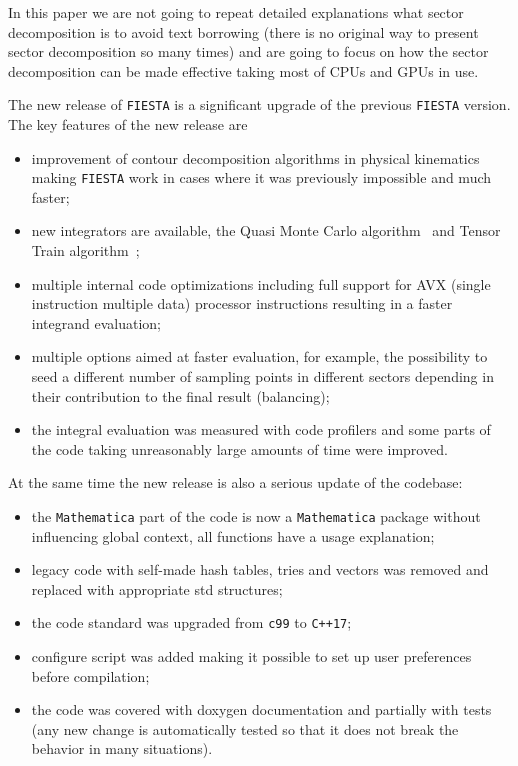 \documentclass[preprint,12pt]{elsarticle}
\begin{document}
In this paper we are not going to repeat detailed explanations what sector decomposition is to avoid 
text borrowing (there is no original way to present sector decomposition so many times)
and are going to focus on how the sector decomposition can be made effective taking most 
of CPUs and GPUs in use.

The new release of {\tt FIESTA} is a significant upgrade of the previous {\tt FIESTA} version.
The key features of the new release are
\begin{itemize}
 \item improvement of contour decomposition algorithms in physical kinematics making {\tt FIESTA} work in cases where it was previously impossible and much faster; 
 \item new integrators are available, the Quasi Monte Carlo algorithm~\cite{BOROWKA2019120} and Tensor Train algorithm~\cite{Vysotsky2021};
 \item multiple internal code optimizations including full support for AVX (single instruction multiple data) processor instructions resulting in a faster integrand evaluation;
 \item multiple options aimed at faster evaluation, for example, the possibility to seed a different number of sampling points in different sectors depending in their contribution to the final result (balancing);
 \item the integral evaluation was measured with code profilers and some parts of the code taking unreasonably large amounts of time were improved.
\end{itemize}

At the same time the new release is also a serious update of the codebase:
\begin{itemize}
 \item the {\tt Mathematica} part of the code is now a {\tt Mathematica} package without influencing global context,
 all functions have a usage explanation;
 \item legacy code with self-made hash tables, tries and vectors was removed and replaced with appropriate std structures;
 \item the code standard was upgraded from {\tt c99} to {\tt C++17};
 \item configure script was added making it possible to set up user preferences before compilation;
 \item the code was covered with doxygen documentation and partially with tests (any new change is automatically tested so that it does not break the behavior in many situations).
\end{itemize}
\end{document}
